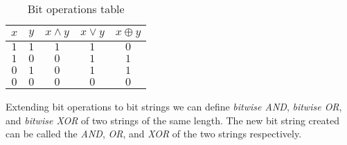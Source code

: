 \documentclass[12pt letter]{report}
\begin{document}
\begin{table}[h!]
  \caption{Bit operations table}\label{tab:ops}
  \begin{center}
    \begin{tabular}{|c|c|c|c|c|}
      \hline
      $x$ & $y$ & $x \wedge y$ & $x \vee y$ & $x \oplus y$ \\ [0.5ex]
      \hline
      \hline
      $1$ & $1$ & $1$          & $1$        & $0$          \\
      $1$ & $0$ & $0$          & $1$        & $1$          \\
      $0$ & $1$ & $0$          & $1$        & $1$          \\
      $0$ & $0$ & $0$          & $0$        & $0$          \\
      \hline
    \end{tabular}
  \end{center}
\end{table}



Extending bit operations to bit strings we can define \textit{bitwise AND}, \textit{bitwise OR}, and \textit{bitwise XOR} of two strings of the same length. The new bit string created can be called the \textit{AND}, \textit{OR}, and
\textit{XOR} of the two strings respectively.
\end{document}
